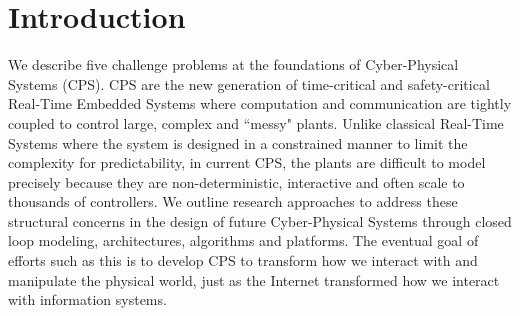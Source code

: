 \section{Introduction}
We describe five challenge problems at the foundations of Cyber-Physical Systems (CPS). CPS are the new generation of time-critical and safety-critical Real-Time Embedded Systems where computation and communication are tightly coupled to control large, complex and ``messy" plants. Unlike classical Real-Time Systems where the system is designed in a constrained manner to limit the complexity for predictability, in current CPS, the plants are difficult to model precisely because they are non-deterministic, interactive and often scale to thousands of controllers. We outline research approaches to address these structural concerns in the design of future Cyber-Physical Systems through closed loop modeling, architectures, algorithms and platforms. The eventual goal of efforts such as this is to develop CPS to transform how we interact with and manipulate the physical world, just as the Internet transformed how we interact with information systems.

